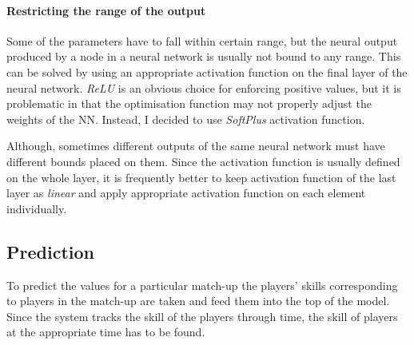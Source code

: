 \documentclass[12pt,a4paper]{book}
\begin{document}
\paragraph{Restricting the range of the output}
Some of the parameters have to fall within certain range, but the neural output produced by a node in a neural network is usually not bound to any range.
This can be solved by using an appropriate activation function on the final layer of the neural network.
\emph{ReLU} is an obvious choice for enforcing positive values, but it is problematic in that the optimisation function may not properly adjust the weights of the NN.
Instead, I decided to use \emph{SoftPlus} activation function.

Although, sometimes different outputs of the same neural network must have different bounds placed on them.
Since the activation function is usually defined on the whole layer, it is frequently better to keep activation function of the last layer as \emph{linear} and apply appropriate activation function on each element individually.

\subsection{Prediction}
To predict the values for a particular match-up the players' skills corresponding to players in the match-up are taken and feed them into the top of the model.
Since the system tracks the skill of the players through time, the skill of players at the appropriate time has to be found.
\end{document}

